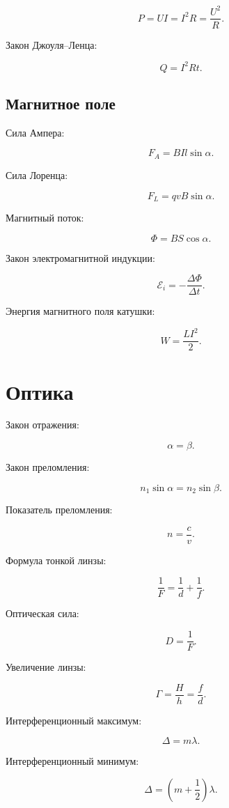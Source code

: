 \documentclass[12pt,a4paper]{article}
\theoremstyle{definition}
\theoremstyle{remark}
\begin{document}
\[
    P=UI=I^2R=\frac{U^2}{R}.
\]

Закон Джоуля--Ленца:

\[
    Q=I^2Rt.
\]

\subsection{Магнитное поле}

Сила Ампера:

\[
    F_A=BIl\sin\alpha.
\]

Сила Лоренца:

\[
    F_L=qvB\sin\alpha.
\]

Магнитный поток:

\[
    \Phi=B S\cos\alpha.
\]

Закон электромагнитной индукции:

\[
    \mathcal{E}_i
    =
    -\frac{\Delta\Phi}{\Delta t}.
\]

Энергия магнитного поля катушки:

\[
    W
    =
    \frac{LI^2}{2}.
\]

\section{Оптика}

Закон отражения:

\[
    \alpha=\beta.
\]

Закон преломления:

\[
    n_1\sin\alpha=n_2\sin\beta.
\]

Показатель преломления:

\[
    n=\frac{c}{v}.
\]

Формула тонкой линзы:

\[
    \frac{1}{F}
    =
    \frac{1}{d}
    +
    \frac{1}{f}.
\]

Оптическая сила:

\[
    D=\frac{1}{F}.
\]

Увеличение линзы:

\[
    \Gamma
    =
    \frac{H}{h}
    =
    \frac{f}{d}.
\]

Интерференционный максимум:

\[
    \Delta=m\lambda.
\]

Интерференционный минимум:

\[
    \Delta
    =
    \left(m+\frac{1}{2}\right)\lambda.
\]

\end{document}
